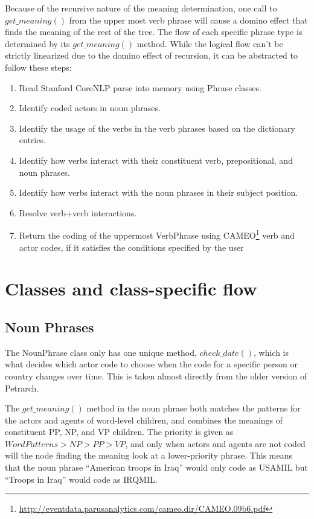 \documentclass[11pt]{article}
\begin{document}
Because of the recursive nature of the meaning determination, one call to 
$get\_meaning()$ from the upper most verb phrase will cause a domino effect that 
finds the meaning of the rest of the tree. The flow of each specific phrase type 
is determined by its $get\_meaning()$ method. While the logical flow can't be 
strictly linearized due to the domino effect of recursion, it can be 
abstracted to follow these steps:
\begin{enumerate}
  \item Read Stanford CoreNLP parse into memory using Phrase classes.  
  \item Identify coded actors in noun phrases.
  \item Identify the usage of the verbs in the verb phrases based on the 
  dictionary entries.
  \item Identify how verbs interact with their constituent verb, prepositional, and noun 
  phrases.
  \item Identify how verbs interact with the noun phrases in their subject 
  position.
  \item Resolve verb+verb interactions.
  \item Return the coding of the uppermost VerbPhrase using CAMEO\footnote{\url{http://eventdata.parusanalytics.com/cameo.dir/CAMEO.09b6.pdf}} verb and actor codes, if it satisfies the 
  conditions specified by the user
\end{enumerate}
\section{Classes and class-specific flow}
\subsection{Noun Phrases}
The NounPhrase class only has one unique method, $check\_date()$, which is what 
decides which actor code to choose when the code for a specific person or 
country changes over time. This is taken almost directly from the older version 
of Petrarch. 

The $get\_meaning()$ method in the noun phrase both matches the patterns for the 
actors and agents of word-level children, and combines the meanings of 
constituent PP, NP, and VP children. The priority is given as $Word Patterns > NP > PP 
> VP$, and only when actors and agents are not coded will the node finding the 
meaning look at a lower-priority phrase. This means that the noun phrase 
``American troops in Iraq'' would only code as USAMIL but ``Troops in Iraq'' would code as 
IRQMIL. 
\end{document}
